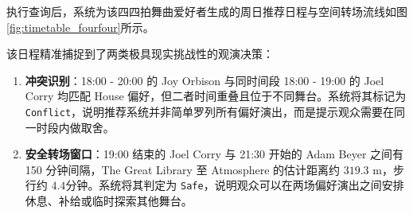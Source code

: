 \documentclass[11pt,a4paper,fontset=fandol]{ctexart}
\begin{document}
执行查询后，系统为该四四拍舞曲爱好者生成的周日推荐日程与空间转场流线如图\ref{fig:timetable_fourfour}所示。

该日程精准捕捉到了两类极具现实挑战性的观演决策：
\begin{enumerate}
    \item \textbf{冲突识别}：18:00 - 20:00 的 Joy Orbison 与同时间段 18:00 - 19:00 的 Joel Corry 均匹配 House 偏好，但二者时间重叠且位于不同舞台。系统将其标记为 \texttt{Conflict}，说明推荐系统并非简单罗列所有偏好演出，而是提示观众需要在同一时段内做取舍。
    \item \textbf{安全转场窗口}：19:00 结束的 Joel Corry 与 21:30 开始的 Adam Beyer 之间有 150 分钟间隔，The Great Library 至 Atmosphere 的估计距离约 $319.3\text{ m}$，步行约 $4.4\text{分钟}$。系统将其判定为 \texttt{Safe}，说明观众可以在两场偏好演出之间安排休息、补给或临时探索其他舞台。
\end{enumerate}
\end{document}
